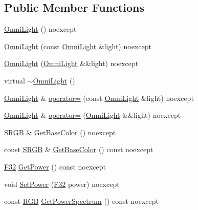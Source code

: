 \subsection*{Public Member Functions}
\begin{DoxyCompactItemize}
\item 
\hyperlink{classmage_1_1rendering_1_1_omni_light_a641472ade99dc84b6e82e3d01d8b574a}{Omni\+Light} () noexcept
\item 
\hyperlink{classmage_1_1rendering_1_1_omni_light_adc27e555c730dbe8891e6ac4eb9d3900}{Omni\+Light} (const \hyperlink{classmage_1_1rendering_1_1_omni_light}{Omni\+Light} \&light) noexcept
\item 
\hyperlink{classmage_1_1rendering_1_1_omni_light_a235afcf044e62a3f6672316eb8f3cd99}{Omni\+Light} (\hyperlink{classmage_1_1rendering_1_1_omni_light}{Omni\+Light} \&\&light) noexcept
\item 
virtual \hyperlink{classmage_1_1rendering_1_1_omni_light_af0981e056620d3f0df827098448c8052}{$\sim$\+Omni\+Light} ()
\item 
\hyperlink{classmage_1_1rendering_1_1_omni_light}{Omni\+Light} \& \hyperlink{classmage_1_1rendering_1_1_omni_light_aac914061f6798131e7f59275b4716b48}{operator=} (const \hyperlink{classmage_1_1rendering_1_1_omni_light}{Omni\+Light} \&light) noexcept
\item 
\hyperlink{classmage_1_1rendering_1_1_omni_light}{Omni\+Light} \& \hyperlink{classmage_1_1rendering_1_1_omni_light_a8126d5d0d3a45d0063c3fd2f28e3826e}{operator=} (\hyperlink{classmage_1_1rendering_1_1_omni_light}{Omni\+Light} \&\&light) noexcept
\item 
\hyperlink{structmage_1_1_s_r_g_b}{S\+R\+GB} \& \hyperlink{classmage_1_1rendering_1_1_omni_light_a37a2f333a11239a497b4a087cf495b74}{Get\+Base\+Color} () noexcept
\item 
const \hyperlink{structmage_1_1_s_r_g_b}{S\+R\+GB} \& \hyperlink{classmage_1_1rendering_1_1_omni_light_a8a9b3b3b4fe42ae97b472b8842684967}{Get\+Base\+Color} () const noexcept
\item 
\hyperlink{namespacemage_aa97e833b45f06d60a0a9c4fc22ae02c0}{F32} \hyperlink{classmage_1_1rendering_1_1_omni_light_a43c6be5649668705ffb1ace363960b00}{Get\+Power} () const noexcept
\item 
void \hyperlink{classmage_1_1rendering_1_1_omni_light_a1887bf9c7f732188814b34f686638443}{Set\+Power} (\hyperlink{namespacemage_aa97e833b45f06d60a0a9c4fc22ae02c0}{F32} power) noexcept
\item 
const \hyperlink{structmage_1_1_r_g_b}{R\+GB} \hyperlink{classmage_1_1rendering_1_1_omni_light_a82366151b99cc4791d8b361331f75833}{Get\+Power\+Spectrum} () const noexcept

\end{DoxyCompactItemize}
